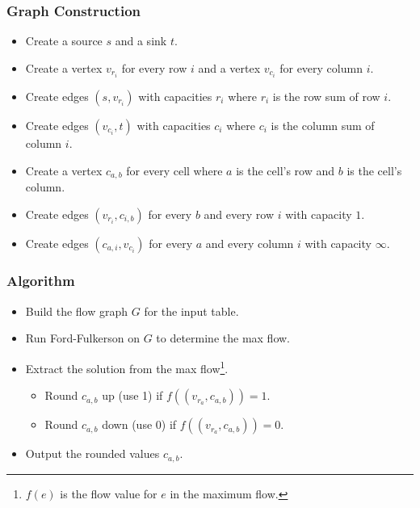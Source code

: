 \documentclass[12pt]{article}
\begin{document}
\subsubsection*{Graph Construction}
\begin{itemize}
	\item Create a source $s$ and a sink $t$.
	\item Create a vertex $v_{r_i}$ for every row $i$ and a vertex $v_{c_i}$ for every column $i$.
	\item Create edges $(s, v_{r_i})$ with capacities $r_i$ where $r_i$ is the row sum of row $i$.
	\item Create edges $(v_{c_i}, t)$ with capacities $c_i$ where $c_i$ is the column sum of column $i$.
	\item Create a vertex $c_{a,b}$ for every cell where $a$ is the cell's row and $b$ is the cell's column.
	\item Create edges $(v_{r_i}, c_{i,b})$ for every $b$ and every row $i$ with capacity $1$.
	\item Create edges $(c_{a,i}, v_{c_i})$ for every $a$ and every column $i$ with capacity $\infty$.
\end{itemize}

\subsubsection*{Algorithm}
\begin{itemize}
	\item Build the flow graph $G$ for the input table.
	\item Run Ford-Fulkerson on $G$ to determine the max flow.
	\item Extract the solution from the max flow\footnote{$f(e)$ is the flow value for $e$ in the maximum flow.}.
	\begin{itemize}
		\item Round $c_{a,b}$ up (use 1) if $f((v_{r_a}, c_{a,b})) = 1$.
		\item Round $c_{a,b}$ down (use 0) if $f((v_{r_a}, c_{a,b})) = 0$.
	\end{itemize}
	\item Output the rounded values $c_{a,b}$.
\end{itemize}
\end{document}
